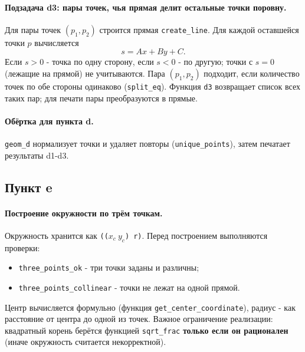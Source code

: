 \documentclass[a4paper, 11pt]{article}
\begin{document}
\paragraph{Подзадача d3: пары точек, чья прямая делит остальные точки поровну.}
Для пары точек $(p_1,p_2)$ строится прямая \texttt{create\_line}. Для каждой оставшейся точки $p$ вычисляется
\[
s = A x + B y + C.
\]
Если $s>0$ - точка по одну сторону, если $s<0$ - по другую; точки с $s=0$ (лежащие на прямой) не учитываются.
Пара $(p_1,p_2)$ подходит, если количество точек по обе стороны одинаково (\texttt{split\_eq}).
Функция \texttt{d3} возвращает список всех таких пар; для печати пары преобразуются в прямые.

\paragraph{Обёртка для пункта d.}
\texttt{geom\_d} нормализует точки и удаляет повторы (\texttt{unique\_points}), затем печатает результаты d1-d3.

\subsection*{Пункт e}

\paragraph{Построение окружности по трём точкам.}
Окружность хранится как \texttt{(($x_c\ y_c$) r)}.
Перед построением выполняются проверки:
\begin{itemize}
  \item \texttt{three\_points\_ok} - три точки заданы и различны;
  \item \texttt{three\_points\_collinear} - точки не лежат на одной прямой.
\end{itemize}
Центр вычисляется формульно (функция \texttt{get\_center\_coordinate}), радиус - как расстояние от центра до одной из точек.
Важное ограничение реализации: квадратный корень берётся функцией \texttt{sqrt\_frac} \textbf{только если он рационален}
(иначе окружность считается некорректной).
\end{document}
